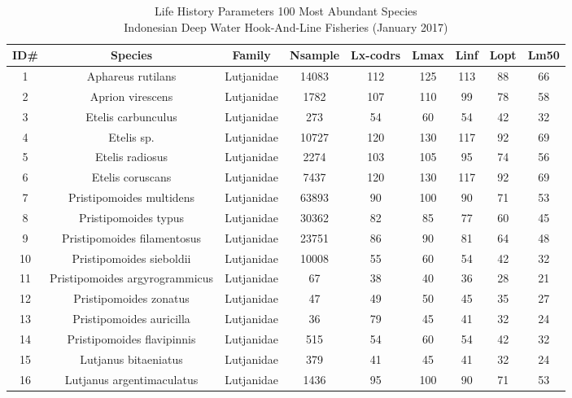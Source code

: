 \clearpage
\newpage

%
%
\captionsetup{width=1\textwidth, justification=centering}
\setlength{\LTpost}{0pt}
{\small
\begin{longtable}{ccccccccc}
\caption{Life History Parameters 100 Most Abundant Species\\Indonesian Deep Water Hook-And-Line Fisheries (January 2017)} \\ 
  \hline
ID\# & Species & Family & Nsample & Lx-codrs & Lmax & Linf & Lopt & Lm50 \\ 
  \hline
1 & Aphareus rutilans & Lutjanidae & 14083 & 112 & 125 & 113 & 88 & 66 \\ 
  2 & Aprion virescens & Lutjanidae & 1782 & 107 & 110 & 99 & 78 & 58 \\ 
  3 & Etelis carbunculus & Lutjanidae & 273 & 54 & 60 & 54 & 42 & 32 \\ 
  4 & Etelis sp. & Lutjanidae & 10727 & 120 & 130 & 117 & 92 & 69 \\ 
  5 & Etelis radiosus & Lutjanidae & 2274 & 103 & 105 & 95 & 74 & 56 \\ 
  6 & Etelis coruscans & Lutjanidae & 7437 & 120 & 130 & 117 & 92 & 69 \\ 
  7 & Pristipomoides multidens & Lutjanidae & 63893 & 90 & 100 & 90 & 71 & 53 \\ 
  8 & Pristipomoides typus & Lutjanidae & 30362 & 82 & 85 & 77 & 60 & 45 \\ 
  9 & Pristipomoides filamentosus & Lutjanidae & 23751 & 86 & 90 & 81 & 64 & 48 \\ 
  10 & Pristipomoides sieboldii & Lutjanidae & 10008 & 55 & 60 & 54 & 42 & 32 \\ 
  11 & Pristipomoides argyrogrammicus & Lutjanidae & 67 & 38 & 40 & 36 & 28 & 21 \\ 
  12 & Pristipomoides zonatus & Lutjanidae & 47 & 49 & 50 & 45 & 35 & 27 \\ 
  13 & Pristipomoides auricilla & Lutjanidae & 36 & 79 & 45 & 41 & 32 & 24 \\ 
  14 & Pristipomoides flavipinnis & Lutjanidae & 515 & 54 & 60 & 54 & 42 & 32 \\ 
  15 & Lutjanus bitaeniatus & Lutjanidae & 379 & 41 & 45 & 41 & 32 & 24 \\ 
  16 & Lutjanus argentimaculatus & Lutjanidae & 1436 & 95 & 100 & 90 & 71 & 53 \\ 

\end{longtable}}
